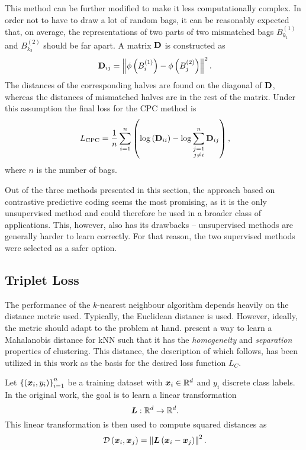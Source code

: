 This method can be further modified to make it less computationally complex. In order not to have to draw a lot of random bags, it can be reasonably expected that, on average, the representations of two parts of two mismatched bags \( B_{k_1}^{(1)} \) and \( B_{k_2}^{(2)} \) should be far apart. A matrix \( \mathbf{D} \) is constructed as
\begin{equation}\label{eq:bag-distance-matrix}
	\phantom{.}\mathbf{D}_{ij} = \left\lVert \phi \left( B_i^{(1)} \right) - \phi \left( B_j^{(2)} \right) \right\rVert^2.
\end{equation}
The distances of the corresponding halves are found on the diagonal of \( \mathbf{D} \), whereas the distances of mismatched halves are in the rest of the matrix. Under this assumption the final loss for the CPC method is
\begin{equation}
	\phantom{,}L_\mathrm{CPC} = \frac{1}{n} \sum_{i = 1}^n \left( \log \left( \mathbf{D}_{ii} \right) - \log \sum_{\substack{j = 1 \\ j \neq i}}^n \mathbf{D}_{ij} \right),
\end{equation}
where \( n \) is the number of bags.

Out of the three methods presented in this section, the approach based on contrastive predictive coding seems the most promising, as it is the only unsupervised method and could therefore be used in a broader class of applications. This, however, also has its drawbacks -- unsupervised methods are generally harder to learn correctly. For that reason, the two supervised methods were selected as a safer option.

\subsection{Triplet Loss}
The performance of the \( k \)-nearest neighbour algorithm depends heavily on the distance metric used. Typically, the Euclidean distance is used. However, ideally, the metric should adapt to the problem at hand. \cite{weinberger_distance_2006} present a way to learn a Mahalanobis distance for kNN such that it has the \textit{homogeneity} and \textit{separation} properties of clustering. This distance, the description of which follows, has been utilized in this work as the basis for the desired loss function \( L_C \).

Let \( \left\{ \left( \bm{x}_i, y_i \right) \right\}_{i = 1}^n \) be a training dataset with \( \bm{x}_i \in \mathbb{R}^d \) and \( y_i \) discrete class labels. In the original work, the goal is to learn a linear transformation
\[ \phantom{.}\bm{L} : \mathbb{R}^d \to \mathbb{R}^d. \]
This linear transformation is then used to compute squared distances as
\[ \phantom{.}\mathcal{D} \left( \bm{x}_i, \bm{x}_j \right) = \left\lVert \bm{L} \left( \bm{x}_i - \bm{x}_j \right) \right\rVert^2. \]

